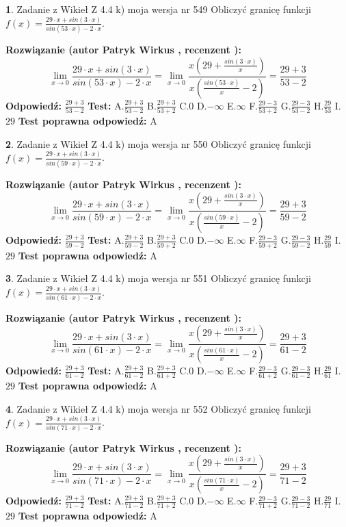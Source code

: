 \documentclass[12pt, a4paper]{article}
\theoremstyle{definition} %
\newtheorem{zad}{}
\newcommand{\zadStart}[1]{\begin{zad}#1\newline}
\newcommand{\zadStop}{\end{zad}}
\newcommand{\rozwStart}[2]{\noindent \textbf{Rozwiązanie (autor #1 , recenzent #2): }\newline}
\newcommand{\rozwStop}{\newline}
\newcommand{\odpStart}{\noindent \textbf{Odpowiedź:}\newline}
\newcommand{\odpStop}{\newline}
\newcommand{\testStart}{\noindent \textbf{Test:}\newline}
\newcommand{\testStop}{\newline}
\newcommand{\kluczStart}{\noindent \textbf{Test poprawna odpowiedź:}\newline}
\newcommand{\kluczStop}{\newline}
\begin{document}
\zadStart{Zadanie z Wikieł Z 4.4 k) moja wersja nr 549}
Obliczyć granicę funkcji $f(x)=\frac{29\cdot x +sin(3\cdot x)}{sin(53\cdot x) -2\cdot x}$.
\zadStop
\rozwStart{Patryk Wirkus}{}
$$\lim\limits_{x\to 0}\frac{29\cdot x +sin(3\cdot x)}{sin(53\cdot x) -2\cdot x}
=\lim\limits_{x\to 0}\frac{x(29+\frac{sin(3\cdot x)}{x})}{x(\frac{sin(53\cdot x)}{x}-2)}
=\frac{29+3}{53-2}$$
\rozwStop
\odpStart
$\frac{29+3}{53-2}$
\odpStop
\testStart
A.$\frac{29+3}{53-2}$
B.$\frac{29+3}{53+2}$
C.$0$
D.$-\infty$
E.$\infty$
F.$\frac{29-3}{53+2}$
G.$\frac{29-3}{53-2}$
H.$\frac{29}{53}$
I.$29$
\testStop
\kluczStart
A
\kluczStop



\zadStart{Zadanie z Wikieł Z 4.4 k) moja wersja nr 550}
Obliczyć granicę funkcji $f(x)=\frac{29\cdot x +sin(3\cdot x)}{sin(59\cdot x) -2\cdot x}$.
\zadStop
\rozwStart{Patryk Wirkus}{}
$$\lim\limits_{x\to 0}\frac{29\cdot x +sin(3\cdot x)}{sin(59\cdot x) -2\cdot x}
=\lim\limits_{x\to 0}\frac{x(29+\frac{sin(3\cdot x)}{x})}{x(\frac{sin(59\cdot x)}{x}-2)}
=\frac{29+3}{59-2}$$
\rozwStop
\odpStart
$\frac{29+3}{59-2}$
\odpStop
\testStart
A.$\frac{29+3}{59-2}$
B.$\frac{29+3}{59+2}$
C.$0$
D.$-\infty$
E.$\infty$
F.$\frac{29-3}{59+2}$
G.$\frac{29-3}{59-2}$
H.$\frac{29}{59}$
I.$29$
\testStop
\kluczStart
A
\kluczStop



\zadStart{Zadanie z Wikieł Z 4.4 k) moja wersja nr 551}
Obliczyć granicę funkcji $f(x)=\frac{29\cdot x +sin(3\cdot x)}{sin(61\cdot x) -2\cdot x}$.
\zadStop
\rozwStart{Patryk Wirkus}{}
$$\lim\limits_{x\to 0}\frac{29\cdot x +sin(3\cdot x)}{sin(61\cdot x) -2\cdot x}
=\lim\limits_{x\to 0}\frac{x(29+\frac{sin(3\cdot x)}{x})}{x(\frac{sin(61\cdot x)}{x}-2)}
=\frac{29+3}{61-2}$$
\rozwStop
\odpStart
$\frac{29+3}{61-2}$
\odpStop
\testStart
A.$\frac{29+3}{61-2}$
B.$\frac{29+3}{61+2}$
C.$0$
D.$-\infty$
E.$\infty$
F.$\frac{29-3}{61+2}$
G.$\frac{29-3}{61-2}$
H.$\frac{29}{61}$
I.$29$
\testStop
\kluczStart
A
\kluczStop



\zadStart{Zadanie z Wikieł Z 4.4 k) moja wersja nr 552}
Obliczyć granicę funkcji $f(x)=\frac{29\cdot x +sin(3\cdot x)}{sin(71\cdot x) -2\cdot x}$.
\zadStop
\rozwStart{Patryk Wirkus}{}
$$\lim\limits_{x\to 0}\frac{29\cdot x +sin(3\cdot x)}{sin(71\cdot x) -2\cdot x}
=\lim\limits_{x\to 0}\frac{x(29+\frac{sin(3\cdot x)}{x})}{x(\frac{sin(71\cdot x)}{x}-2)}
=\frac{29+3}{71-2}$$
\rozwStop
\odpStart
$\frac{29+3}{71-2}$
\odpStop
\testStart
A.$\frac{29+3}{71-2}$
B.$\frac{29+3}{71+2}$
C.$0$
D.$-\infty$
E.$\infty$
F.$\frac{29-3}{71+2}$
G.$\frac{29-3}{71-2}$
H.$\frac{29}{71}$
I.$29$
\testStop
\kluczStart
A
\kluczStop
\end{document}
